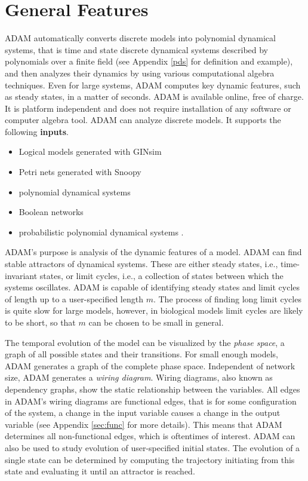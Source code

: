 \documentclass[11pt]{amsart}
\begin{document}
\section{General Features}
ADAM automatically converts discrete models into polynomial dynamical
systems, that is time and state discrete dynamical systems described by polynomials over a finite field (see Appendix \ref{pds} for definition and example),
%
%
and then analyzes their dynamics by using various computational algebra techniques. Even for large systems, ADAM
computes key dynamic features, such as steady states, in a matter of seconds.
ADAM is available online, free of charge. It is platform
independent and does not require installation of any software or computer
algebra tool.
ADAM can analyze discrete models. It supports the following {\bf inputs}.
\begin{itemize}
\item Logical models generated with GINsim \cite{GINsim}
\item Petri nets generated with Snoopy \cite{Snoopy}
\item polynomial dynamical systems
\item Boolean networks
\item probabilistic polynomial dynamical systems \cite{shmulevich}.
\end{itemize}
ADAM’s purpose is analysis of the dynamic features of a model. ADAM can find stable attractors of dynamical systems. These are either steady states, i.e., time-invariant states,
or limit cycles, i.e., a collection of states between which the systems oscillates. ADAM is capable of identifying steady states and limit cycles of length up to a user-specified length $m$. The process of finding long limit cycles is quite slow for large models, however, in biological models limit cycles are likely to be short, so that $m$ can be chosen to be small in general.

The temporal evolution of the model can be visualized by the {\it phase space}, a graph of all possible states and their transitions. For small enough models, ADAM generates a graph of the complete phase space. Independent of network size, ADAM generates a {\it wiring diagram}. Wiring diagrams, also known as dependency graphs, show the static relationship between the variables. All edges in ADAM’s wiring diagrams are functional edges, that is for some configuration of the system, a change in the input variable causes a change in the output variable (see Appendix \ref{sec:func} for more details). This means that ADAM determines all non-functional edges, which is oftentimes of interest.
ADAM can also be used to study evolution of user-specified initial states. The evolution of a single state can be determined by computing the trajectory initiating from this state and evaluating it until an attractor is reached.
\end{document}
